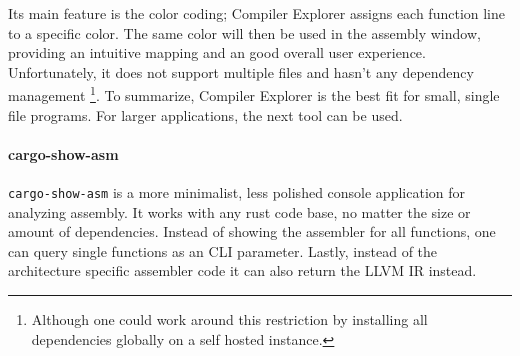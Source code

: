 Its main feature is the color coding; Compiler Explorer assigns each function line to a specific color. The same color will then be used in the assembly window, providing an intuitive mapping and an good overall user experience. Unfortunately, it does not support multiple files and hasn't any dependency management \footnote{Although one could work around this restriction by installing all dependencies globally on a self hosted instance.}. To summarize, Compiler Explorer is the best fit for small, single file programs. For larger applications, the next tool can be used.

\paragraph{cargo-show-asm}

\texttt{cargo-show-asm} \cite{cargoshowasm} is a more minimalist, less polished console application for analyzing assembly. It works with any rust code base, no matter the size or amount of dependencies. Instead of showing the assembler for all functions, one can query single functions as an CLI parameter. Lastly, instead of the architecture specific assembler code it can also return the \ac{LLVM} \ac{IR} instead.

